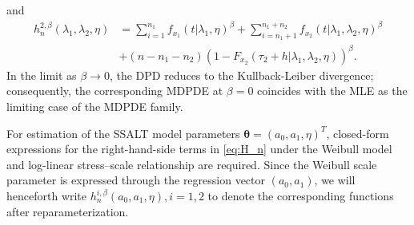 \documentclass{article}
\begin{document}
and
\begin{align*}
h_{n}^{2,\beta}\left(\lambda_1, \lambda_2,\eta\right)&=\sum_{i=1}^{n_1}f_{x_1}\left(t|\lambda_1,\eta\right)^{\beta}+\sum_{i=n_1+1}^{n_1+n_2} f_{x_2}\left(t|\lambda_1,\lambda_2,\eta\right)^{\beta}  \\
&+\left(n-n_1-n_2\right)\left(1-F_{x_2}\left(\tau_2+h|\lambda_1,\lambda_2,\eta\right)\right)^{\beta} .
\end{align*}
In the limit as $\beta \rightarrow 0$, the DPD reduces to the Kullback-Leiber divergence; consequently, the corresponding MDPDE at $\beta=0$ coincides with the MLE as the limiting case of the MDPDE family.
  
%

For estimation of the SSALT model parameters $\boldsymbol{\theta} = \left(a_0,a_1,\eta\right)^T$, closed-form expressions for the right-hand-side terms in \eqref{eq:H_n} under the Weibull model and log-linear stress–scale relationship are required. Since the Weibull scale parameter is expressed through the regression vector $(a_0,a_1)$, we will henceforth write 
$h_{n}^{i,\beta}\left(a_0,a_1,\eta\right), i =1,2$  to denote the corresponding functions after reparameterization.
\end{document}
